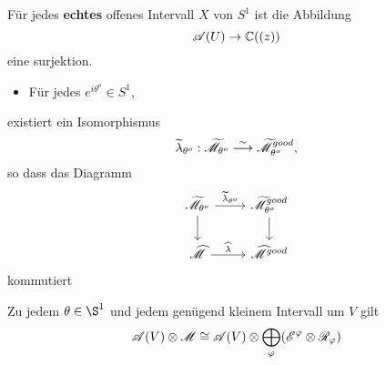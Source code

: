 \begin{lem}
  Für jedes \textbf{echtes} offenes Intervall $X$ von $S^1$ ist die Abbildung
  \[
    \mathscr{A}(U)\to \mathbb{C}((z))
  \]
  eine surjektion.
  \begin{comment}
    \begin{itemize}
      \item $x\mapsto e^{-\frac{1}{x}}$ hat verschwindende asymptotische
        Erweiterung in Sektoren um $\theta=0$
        \begin{itemize}
          \item geht schneller als jedes Polynom gegen $0$
        \end{itemize}
      \item $ 0\to \sA^{<0} \to \sA \overset{T}{\to}
          \underset{\hat\cO_{S^1}}{\underbrace{\pi^{-1}\hat\cO_{D}}} \to 0$
    \end{itemize}
  \end{comment}
\end{lem}
\begin{paracol}{2} %
  \begin{thm}
    \begin{itemize}
      \item Für jedes $e^{i\theta^o}\in S^1$,
    \end{itemize}
    existiert ein Isomorphismus
    \[
      \widetilde\lambda_{\theta^o}: \widetilde{\mathscr{M}}_{\theta^o}
      \overset{\sim}{\longrightarrow}\widetilde{\mathscr{M}}^{good}_{\theta^o},
    \]
    so dass das Diagramm
    \[ \begin{tikzcd}
        \tilde\sM_{\theta^o} \dar \rar{\tilde\lambda_{\theta^o}} &
        \tilde\sM^{good}_{\theta^o} \dar
        \\\hat\sM \rar{\hat\lambda} &
        \hat\sM^{good}
    \end{tikzcd} \]
    kommutiert
  \end{thm}
\switchcolumn %
\begin{thm}
  Zu jedem $\theta\in\S^1$ und jedem genügend kleinem Intervall um $V$ gilt
  \[
    \mathscr{A}(V)\otimes\mathscr{M}\cong\mathscr{A}(V)\otimes\bigoplus_\varphi(\mathscr{E}^\varphi\otimes\mathscr{R}_\varphi)
  \]
\end{thm}
\end{paracol} %
